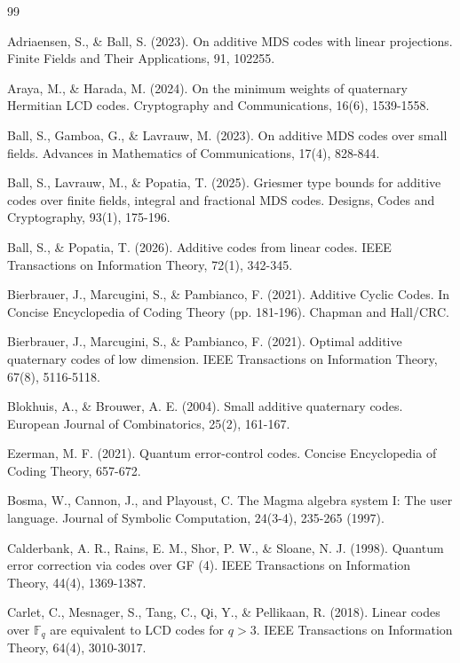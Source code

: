 \documentclass[a4paper,12pt]{article}
\theoremstyle{plain}
\theoremstyle{definition}
\begin{document}
\begin{thebibliography}{99} 

Adriaensen, S., \& Ball, S. (2023). On additive MDS codes with linear projections. Finite Fields and Their Applications, 91, 102255.

Araya, M., \& Harada, M. (2024). On the minimum weights of quaternary Hermitian LCD codes. Cryptography and Communications, 16(6), 1539-1558.


Ball, S., Gamboa, G., \& Lavrauw, M. (2023). On additive MDS codes over small fields. Advances in Mathematics of Communications, 17(4), 828-844.

Ball, S., Lavrauw, M., \& Popatia, T. (2025). Griesmer type bounds for additive codes over finite fields, integral and fractional MDS codes. Designs, Codes and Cryptography, 93(1), 175-196.

Ball, S., \& Popatia, T. (2026). Additive codes from linear codes. IEEE Transactions on Information Theory, 72(1), 342-345.

Bierbrauer, J., Marcugini, S., \& Pambianco, F. (2021). Additive Cyclic Codes. In Concise Encyclopedia of Coding Theory (pp. 181-196). Chapman and Hall/CRC.

Bierbrauer, J., Marcugini, S., \& Pambianco, F. (2021). Optimal additive quaternary codes of low dimension. IEEE Transactions on Information Theory, 67(8), 5116-5118.

Blokhuis, A., \& Brouwer, A. E. (2004). Small additive quaternary codes. European Journal of Combinatorics, 25(2), 161-167.

Ezerman, M. F. (2021). Quantum error-control codes. Concise Encyclopedia of Coding Theory, 657-672.

Bosma, W., Cannon, J., and Playoust, C. The Magma algebra system I: The user language. Journal of Symbolic Computation, 24(3-4), 235-265   (1997). 

Calderbank, A. R., Rains, E. M., Shor, P. W., \& Sloane, N. J. (1998). Quantum error correction via codes over GF (4). IEEE Transactions on Information Theory, 44(4), 1369-1387.

Carlet, C., Mesnager, S., Tang, C., Qi, Y., \& Pellikaan, R. (2018). Linear codes over $\mathbb F_q $ are equivalent to LCD codes for $ q> 3$. IEEE Transactions on Information Theory, 64(4), 3010-3017.


\end{thebibliography}
\end{document}
